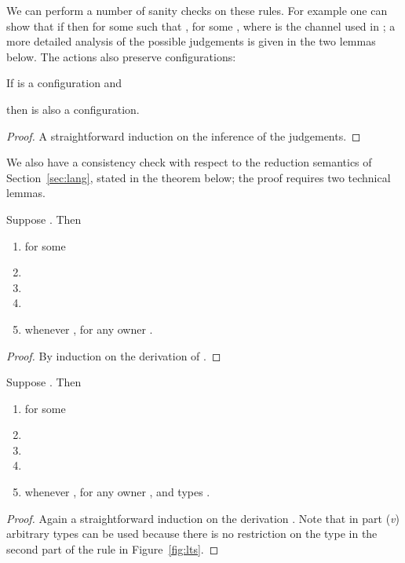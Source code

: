 \documentclass{LMCS}
\begin{document}
We can perform a number of sanity checks on these rules. For example
one can show that if  then  for some  such 
that , for some , 
where  is the channel used in ; a more detailed analysis of the possible
judgements is given in the two lemmas below.
The actions also preserve configurations:
\begin{prop}
    If  is a configuration and 
 
then  is also a configuration. 
\end{prop}
\begin{proof}
  A straightforward induction on the inference of the judgements.
\end{proof}
We also have a consistency check with respect to the reduction semantics
of Section~\ref{sec:lang}, stated in the theorem below; the proof requires
two technical lemmas. 
\begin{lem}\label{lemma:derout1}
  Suppose .
Then
\begin{enumerate}[\em(i)]
\item  for some 
\item  \item 
\item 
\item   
whenever
, for any owner .
\end{enumerate}
\end{lem}
\begin{proof}
  By induction on the derivation of 
   .
\end{proof}

\begin{lem}\label{lemma:derin1}
  Suppose .
Then
\begin{enumerate}[\em(i)]
\item  for some 
\item  \item 
\item 
\item   
whenever
, for any owner , 
and types . 
\end{enumerate}
\end{lem}
\begin{proof}
  Again a straightforward induction on the derivation
.
Note that in part ({\emph v}) arbitrary types  can be used because there is no
restriction on the type   in the second part of the rule  in 
Figure~\ref{fig:lts}. 
\end{proof}
\end{document}
